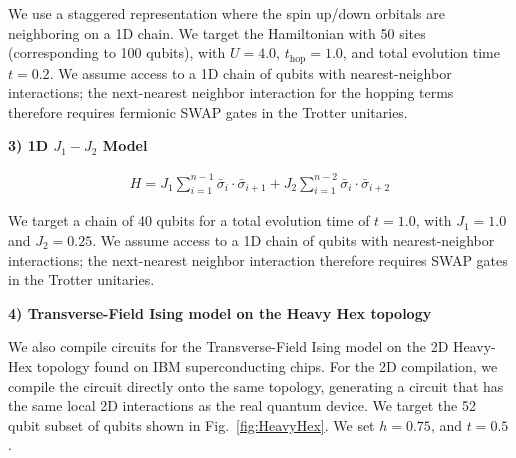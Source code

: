 We use a staggered representation where the spin up/down orbitals are neighboring on a 1D chain. We target the Hamiltonian with 50 sites (corresponding to 100 qubits), with $U=4.0$, $t_{\text{hop}}=1.0$, and total evolution time $t=0.2$. We assume access to a 1D chain of qubits with nearest-neighbor interactions; the next-nearest neighbor interaction for the hopping terms therefore requires fermionic SWAP gates in the Trotter unitaries.

\bigskip

\textbf{3) 1D $J_1-J_2$ Model}

\begin{equation}
\begin{split}
    H = J_1\sum_{i=1}^{n-1} \bar{\sigma}_i \cdot \bar{\sigma}_{i+1} + J_2\sum_{i=1}^{n-2} \bar{\sigma}_i \cdot \bar{\sigma}_{i+2} 
\end{split}
\end{equation}

We target a chain of 40 qubits for a total evolution time of $t=1.0$, with $J_1=1.0$ and $J_2 = 0.25$.
We assume access to a 1D chain of qubits with nearest-neighbor interactions; the next-nearest neighbor interaction therefore requires SWAP gates in the Trotter unitaries.

\bigskip

\textbf{4) Transverse-Field Ising model on the Heavy Hex topology}

We also compile circuits for the Transverse-Field Ising model on the 2D Heavy-Hex topology found on IBM superconducting chips. For the 2D compilation, we compile the circuit directly onto the same topology, generating a circuit that has the same local 2D interactions as the real quantum device. We target the 52 qubit subset of qubits shown in Fig.~\ref{fig:HeavyHex}. We set $h=0.75$, and $t=0.5$.

\clearpage